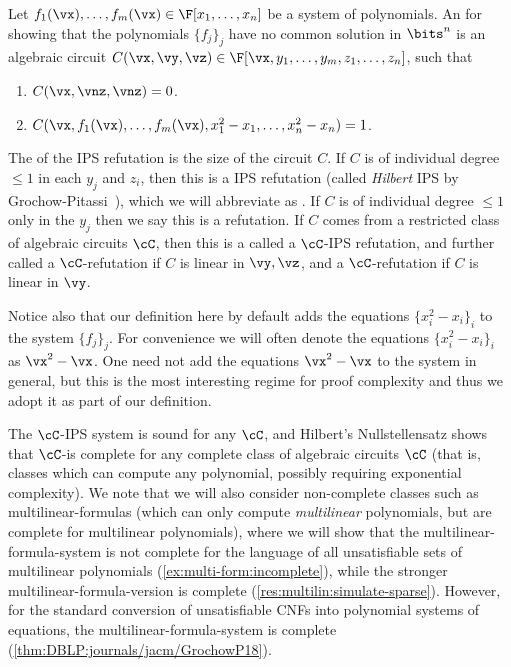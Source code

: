 \documentclass{toc}
\begin{document}
\begin{definition}\label{def:orig-IPS}
        Let $f_1(\vx),\ldots,f_m(\vx)\in\F[x_1,\ldots,x_n]$ be a system of polynomials. An  for showing that the polynomials $\{f_j\}_j$ have no common solution in $\bits^n$ is an algebraic circuit $C(\vx,\vy,\vz)\in\F[\vx,y_1,\ldots,y_m,z_1,\ldots,z_n]$, such that
        \begin{enumerate}
                \item $C(\vx,\vnz,\vnz) = 0$.
                \item $C(\vx,f_1(\vx),\ldots,f_m(\vx),x_1^2-x_1,\ldots,x_n^2-x_n)=1$.
        \end{enumerate}
        The  of the IPS refutation is the size of the circuit $C$. If $C$ is of individual degree $\le 1$ in each $y_j$ and $z_i$, then this is a  IPS refutation (called \emph{Hilbert} IPS by Grochow-Pitassi~\cite{DBLP:journals/jacm/GrochowP18}), which we will abbreviate as \lIPS. If $C$ is of individual degree $\le 1$ only in the $y_j$ then we say this is a \lbIPS refutation. If $C$ comes from a restricted class of algebraic circuits $\cC$, then this is a called a $\cC$-IPS refutation, and further called a $\cC$-\lIPS refutation if $C$ is linear in $\vy,\vz$, and a $\cC$-\lbIPS refutation if $C$ is linear in $\vy$.
\end{definition}

Notice also that our definition here by default adds the equations $\{x_i^2-x_i\}_i$ to the system $\{f_j\}_j$.  For convenience we will often denote the equations $\{x_i^2-x_i\}_i$ as $\vx^2-\vx$. One need not add the equations $\vx^2-\vx$ to the system in general, but this is the most interesting regime for proof complexity and thus we adopt it as part of our definition.

The $\cC$-IPS system is sound for any $\cC$, and Hilbert's Nullstellensatz shows that $\cC$-\lIPS is complete for any complete class of algebraic circuits $\cC$ (that is, classes which can compute any polynomial, possibly requiring exponential complexity). We note that we will also consider non-complete classes such as multilinear-formulas (which can only compute \emph{multilinear} polynomials, but are complete for multilinear polynomials), where we will show that the multilinear-formula-\lIPS system is not complete for the language of all unsatisfiable sets of multilinear polynomials (\autoref{ex:multi-form:incomplete}), while the stronger multilinear-formula-\lbIPS version is complete (\autoref{res:multilin:simulate-sparse}).  However, for the standard conversion of unsatisfiable CNFs into polynomial systems of equations, the multilinear-formula-\lIPS system is complete (\autoref{thm:DBLP:journals/jacm/GrochowP18}).
\end{document}
